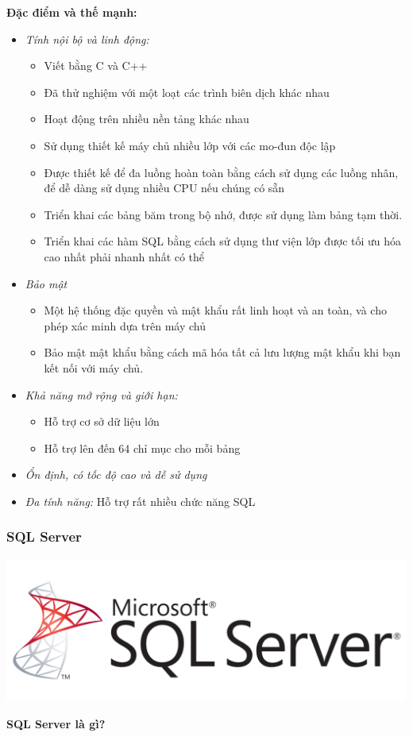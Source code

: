 \textbf{Đặc điểm và thế mạnh:}
\begin{itemize}
    \item \textit{Tính nội bộ và linh động:}
    \begin{itemize}
    \item Viết bằng C và C++
    \item Đã thử nghiệm với một loạt các trình biên dịch khác nhau
    \item Hoạt động trên nhiều nền tảng khác nhau
    \item Sử dụng thiết kế máy chủ nhiều lớp với các mo-đun độc lập
    \item Được thiết kế để đa luồng hoàn toàn bằng cách sử dụng các luồng nhân, để dễ dàng sử dụng nhiều CPU nếu chúng có sẵn
    \item Triển khai các bảng băm trong bộ nhớ, được sử dụng làm bảng tạm thời.
    \item Triển khai các hàm SQL bằng cách sử dụng thư viện lớp được tối ưu hóa cao nhất phải nhanh nhất có thể
    \end{itemize}
    \item \textit{Bảo mật}
    \begin{itemize}
        \item Một hệ thống đặc quyền và mật khẩu rất linh hoạt và an toàn, và cho phép xác minh dựa trên máy chủ
        \item Bảo mật mật khẩu bằng cách mã hóa tất cả lưu lượng mật khẩu khi bạn kết nối với máy chủ.
    \end{itemize}
    \item \textit{Khả năng mở rộng và giới hạn:}
    \begin{itemize}
        \item Hỗ trợ cơ sở dữ liệu lớn
        \item Hỗ trợ lên đến 64 chỉ mục cho mỗi bảng
    \end{itemize}
    \item \textit{Ổn định, có tốc độ cao và dễ sử dụng}
    \item \textit{Đa tính năng:} Hỗ trợ rất nhiều chức năng SQL
\end{itemize}
\subsubsection{SQL Server}
\begin{center}
  \captionsetup{type=figure}
    \includegraphics[scale=0.3]{img/sql-server.png}
\end{center}
\textbf{SQL Server là gì?}

